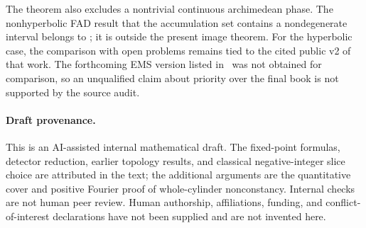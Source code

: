 The theorem also excludes a nontrivial continuous archimedean phase.
The nonhyperbolic FAD result that the accumulation set contains a
nondegenerate interval belongs to
\cite[Theorem 12.5.2(i)]{bch2024}; it is outside the present image theorem.
For the hyperbolic case, the comparison with open problems remains tied
to the cited public v2 of that work. The forthcoming EMS version listed
in~\cite[reference 6]{cp2026} was not obtained for comparison, so an
unqualified claim about priority over the final book is not supported by
the source audit.

\paragraph{Draft provenance.}
This is an AI-assisted internal mathematical draft. The fixed-point
formulas, detector reduction, earlier topology results, and classical
negative-integer slice choice are attributed in the text; the additional
arguments are the quantitative cover and positive Fourier proof of
whole-cylinder nonconstancy. Internal checks are not human peer review.
Human authorship, affiliations, funding, and conflict-of-interest
declarations have not been supplied and are not invented here.
